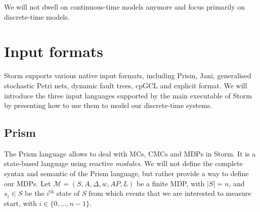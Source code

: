 We will not dwell on continuous-time models anymore and focus primarily on discrete-time models.

\section{Input formats}
Storm supports various native input formats, including Prism, Jani, generalised stochastic Petri nets, dynamic fault trees, cpGCL and explicit format.
We will introduce the three input languages supported by the main executable of Storm by presenting how to use them to model our
discrete-time systems.
\subsection{Prism} \label{prism-subsec}
The Prism language \cite{prismsynt} allows to deal with MCs, CMCs and MDPs in Storm.
It is a state-based language using reactive \textit{modules}.
We will not define the complete syntax and semantic of the Prism language, but rather provide a way to
define our MDPs.
Let $\mathcal{M} = (S, A, \Delta, w, AP, L)$ be a finite MDP, with $|S| = n$, and $s_i \in S$ be the $i^{\text{th}}$ state of $S$ from which events that we are
interested to measure start, with $i \in \{0, \dots, n-1\}$. \\


